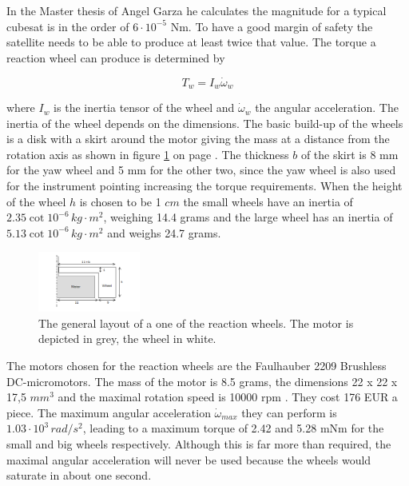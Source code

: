 In the Master thesis of Angel Garza \cite{wheelmotor} he calculates the magnitude for a typical cubesat is in the order of $6\cdot 10^{-5}$ Nm. To have a good margin of safety the satellite needs to be able to produce at least twice that value. The torque a reaction wheel can produce is determined by

\begin{equation}
T_w = I_w \dot{\omega}_w
\label{wheeltorque}
\end{equation}

where $I_w$ is the inertia tensor of the wheel and $\dot{\omega}_w$ the angular acceleration. The inertia of the wheel depends on the dimensions.  The basic build-up of the wheels is a disk with a skirt around the motor giving the mass at a distance from the rotation axis as shown in figure \ref{fig:wheel} on page \pageref{fig:wheel}. The thickness $b$ of the skirt is 8 mm for the yaw wheel and 5 mm for the other two, since the yaw wheel is also used for the instrument pointing increasing the torque requirements. When the height of the wheel $h$ is chosen to be 1 $cm$ the small wheels have an inertia of $2.35\cot 10^{-6}\,kg\cdot m^2$, weighing 14.4 grams and the large wheel has an inertia of $5.13 \cot 10^{-6}\,kg\cdot m^2$ and weighs 24.7 grams.

\begin{figure}
\centering
\includegraphics[width=0.3\textwidth, bb=0 0 216px 190px]{chapters/img/reactionwheel.png}
\caption[Basic reaction wheel]{The general layout of a one of the reaction wheels. The motor is depicted in grey, the wheel in white.}
\label{fig:wheel}
\end{figure}

The motors chosen for the reaction wheels are the Faulhauber 2209 Brushless DC-micromotors. The mass of the motor is 8.5 grams, the dimensions 22 x 22 x 17,5 $mm^3$ and the maximal rotation speed is 10000 rpm \cite{faulhaber}. They cost 176 EUR a piece. The maximum angular acceleration $\dot{\omega}_{max}$ they can perform is $1.03\cdot 10^3\,rad/s^2$, leading to a maximum torque of 2.42 and 5.28 mNm for the small and big wheels respectively. Although this is far more than required, the maximal angular acceleration will never be used because the wheels would saturate in about one second. 

